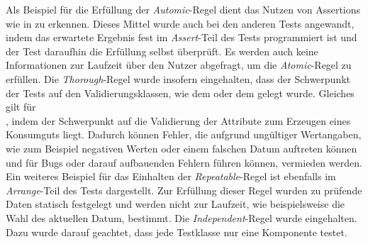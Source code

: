 Als Beispiel für die Erfüllung der \textit{Automic}-Regel dient das Nutzen von Assertions wie in \href{https://github.com/lucasmerkel/dhbw-advancedswe-programmentwurf/blob/5764d7da4cfd0562ed8e96128e92f85c30b7309d/swe_programmentwurf/consumergoods-inventory-planner/0-cip-plugins/src/test/java/de/dhbw/cip/DateValidationTest.java}{} zu erkennen.
Dieses Mittel wurde auch bei den anderen Tests angewandt, indem das erwartete Ergebnis fest im \textit{Assert}-Teil des Tests programmiert ist und der Test daraufhin die Erfüllung selbst überprüft.
Es werden auch keine Informationen zur Laufzeit über den Nutzer abgefragt, um die \textit{Atomic}-Regel zu erfüllen.
Die \textit{Thorough}-Regel wurde insofern eingehalten, dass der Schwerpunkt der Tests auf den Validierungsklassen, wie dem \href{https://github.com/lucasmerkel/dhbw-advancedswe-programmentwurf/blob/5764d7da4cfd0562ed8e96128e92f85c30b7309d/swe_programmentwurf/consumergoods-inventory-planner/0-cip-plugins/src/test/java/de/dhbw/cip/DateValidationTest.java}{} oder dem \href{https://github.com/lucasmerkel/dhbw-advancedswe-programmentwurf/blob/5764d7da4cfd0562ed8e96128e92f85c30b7309d/swe_programmentwurf/consumergoods-inventory-planner/0-cip-plugins/src/test/java/de/dhbw/cip/UnitOfMeasureValueValidationTest.java}{} gelegt wurde.
Gleiches gilt für \\\href{https://github.com/lucasmerkel/dhbw-advancedswe-programmentwurf/blob/5764d7da4cfd0562ed8e96128e92f85c30b7309d/swe_programmentwurf/consumergoods-inventory-planner/0-cip-plugins/src/test/java/de/dhbw/cip/StoreConsumerGoodsTest.java}{}, indem der Schwerpunkt auf die Validierung der Attribute zum Erzeugen eines Konsumguts liegt.
Dadurch können Fehler, die aufgrund ungültiger Wertangaben, wie zum Beispiel negativen Werten oder einem falschen Datum auftreten können und für Bugs oder darauf aufbauenden Fehlern führen können, vermieden werden.
Ein weiteres Beispiel für das Einhalten der \textit{Repeatable}-Regel ist ebenfalls im \textit{Arrange}-Teil des Tests \href{https://github.com/lucasmerkel/dhbw-advancedswe-programmentwurf/blob/5764d7da4cfd0562ed8e96128e92f85c30b7309d/swe_programmentwurf/consumergoods-inventory-planner/0-cip-plugins/src/test/java/de/dhbw/cip/DateValidationTest.java}{} dargestellt.
Zur Erfüllung dieser Regel wurden zu prüfende Daten statisch festgelegt und werden nicht zur Laufzeit, wie beispielsweise die Wahl des aktuellen Datum, bestimmt.
Die \textit{Independent}-Regel wurde eingehalten. Dazu wurde darauf geachtet, dass jede Testklasse nur eine Komponente testet.
